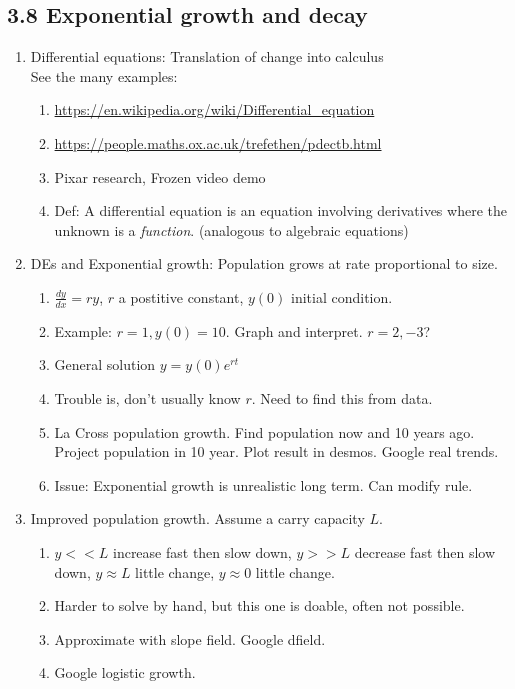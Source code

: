 \documentclass{article}
\begin{document}
\subsection{3.8 Exponential growth and decay}
\begin{enumerate}


\item Differential equations: Translation of change into calculus  \\
 See the many examples:
\begin{enumerate}
\item \url{https://en.wikipedia.org/wiki/Differential_equation}
\item \url{https://people.maths.ox.ac.uk/trefethen/pdectb.html}
\item Pixar research, Frozen video demo
\item Def: A differential equation is an equation involving derivatives where the unknown is a \emph{function}. (analogous to algebraic equations)
\end{enumerate}

\item DEs and Exponential growth: Population grows at rate proportional to size. 
\begin{enumerate}
\item $\frac{dy}{dx} = r y$, $r$ a postitive constant, $y(0)$ initial condition.
\item Example: $r = 1, y(0) = 10$. Graph and interpret. $r = 2, -3$?
\item General solution $y = y(0)e^{rt}$
\item Trouble is, don't usually know $r$. Need to find this from data.
\item La Cross population growth. Find population now and 10 years ago. Project population in 10 year. Plot result in desmos. Google real trends.
\item Issue: Exponential growth is unrealistic long term. Can modify rule.
\end{enumerate}

\item Improved population growth. Assume a carry capacity $L$.
\begin{enumerate}
\item $y << L$ increase fast then slow down, $y >> L$ decrease fast then slow down, $y \approx L$ little change, $y \approx 0$ little change.
\item Harder to solve by hand, but this one is doable, often not possible.
\item Approximate with slope field. Google dfield.
\item Google logistic growth.
\end{enumerate}
\end{enumerate}
\end{document}
